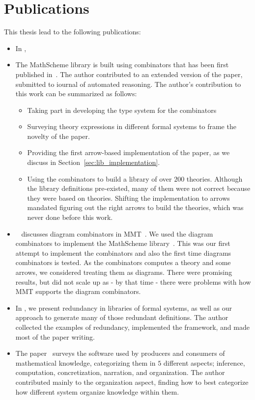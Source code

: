 \section{Publications}
This thesis lead to the following publications: 
\begin{itemize}
    \item In \cite{biformCICM2018},
    \item The MathScheme library is built using combinators that has been first published in~\cite{CaretteOConnorTPC}. The author contributed to an extended version of the paper, submitted to iournal of automated reasoning\cite{carette2018building}. The author's contribution to this work can be summarized as follows: 
    \begin{itemize}
        \item Taking part in developing the type system for the combinators 
        \item Surveying theory expressions in different formal systems to frame the novelty of the paper. 
        \item Providing the first arrow-based implementation of the paper, as we discuss in Section~\ref{sec:lib_implementation}. 
        \item Using the combinators to build a library of over $200$ theories. Although the library definitions pre-existed, many of them were not correct because they were based on theories. Shifting the implementation to arrows mandated figuring out the right arrows to build the theories, which was never done before this work.
    \end{itemize}
    \item ~\cite{diagrams_mmt} discusses diagram combinators in MMT~\cite{MMT}. We used the diagram combinators to implement the MathScheme library~\cite{mathscheme2011experiments}. This was our first attempt to implement the combinators and also the first time diagrams combinators is tested. As the combinators computes a theory and some arrows, we considered treating them as diagrams. There were promising results, but did not scale up as - by that time - there were problems with how MMT supports the diagram combinators. 
    \item In \cite{leverageCICM2020}, we present redundancy in libraries of formal systems, as well as our approach to generate many of those redundant definitions. The author collected the examples of redundancy, implemented the framework, and made most of the paper writing.
    \item The paper~\cite{bercic2020space} surveys the software used by producers and consumers of mathematical knowledge, categorizing them in $5$ different aspects; inference, computation, concretization, narration, and organization. The author contributed mainly to the organization aspect, finding how to best categorize how different system organize knowledge within them. 
\end{itemize}

